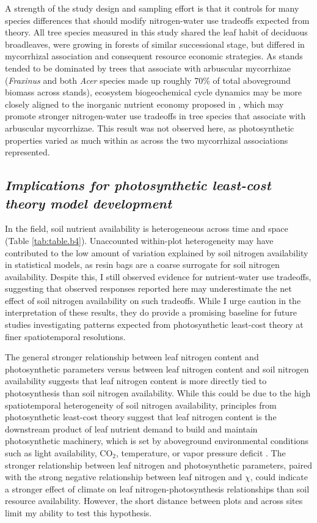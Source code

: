 A strength of the study design and sampling effort is that it controls for many species differences that should modify nitrogen-water use tradeoffs expected from theory. All tree species measured in this study shared the leaf habit of deciduous broadleaves, were growing in forests of similar successional stage, but differed in mycorrhizal association and consequent resource economic strategies. As stands tended to be dominated by trees that associate with arbuscular mycorrhizae (\textit{Fraxinus} and both \textit{Acer} species made up roughly 70\% of total aboveground biomass across stands), ecosystem biogeochemical cycle dynamics may be more closely aligned to the inorganic nutrient economy proposed in , which may promote stronger nitrogen-water use tradeoffs in tree species that associate with arbuscular mycorrhizae. This result was not observed here, as photosynthetic properties varied as much within as across the two mycorrhizal associations represented.
    
\subsection{\textit{Implications for photosynthetic least-cost theory model development}}
\noindent In the field, soil nutrient availability is heterogeneous across time and space (Table \ref{tab:table.b4}). Unaccounted within-plot heterogeneity may have contributed to the low amount of variation explained by soil nitrogen availability in statistical models, as resin bags are a coarse surrogate for soil nitrogen availability. Despite this, I still observed evidence for nutrient-water use tradeoffs, suggesting that observed responses reported here may underestimate the net effect of soil nitrogen availability on such tradeoffs. While I urge caution in the interpretation of these results, they do provide a promising baseline for future studies investigating patterns expected from photosynthetic least-cost theory at finer spatiotemporal resolutions.
    
The general stronger relationship between leaf nitrogen content and photosynthetic parameters versus between leaf nitrogen content and soil nitrogen availability suggests that leaf nitrogen content is more directly tied to photosynthesis than soil nitrogen availability. While this could be due to the high spatiotemporal heterogeneity of soil nitrogen availability, principles from photosynthetic least-cost theory suggest that leaf nitrogen content is the downstream product of leaf nutrient demand to build and maintain photosynthetic machinery, which is set by aboveground environmental conditions such as light availability, CO$_2$, temperature, or vapor pressure deficit . The stronger relationship between leaf nitrogen and photosynthetic parameters, paired with the strong negative relationship between leaf nitrogen and $\chi$, could indicate a stronger effect of climate on leaf nitrogen-photosynthesis relationships than soil resource availability. However, the short distance between plots and across sites limit my ability to test this hypothesis.
    

